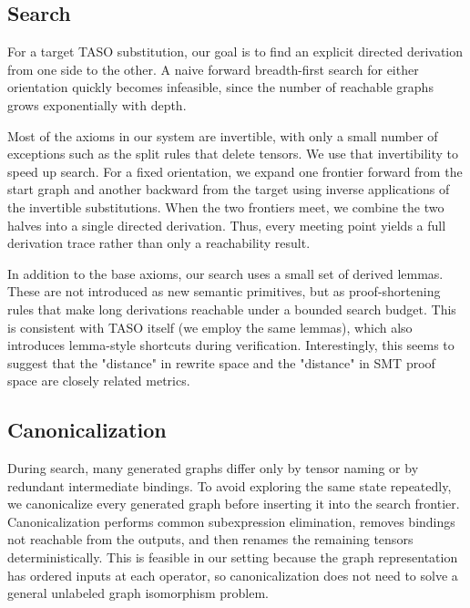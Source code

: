 \documentclass[sigplan,10pt,nonacm]{acmart}
\begin{document}
\subsection{Search}

For a target TASO substitution, our goal is to find an explicit directed derivation from one side to the other. A naive forward breadth-first search for either orientation quickly becomes infeasible, since the number of reachable graphs grows exponentially with depth.

Most of the axioms in our system are invertible, with only a small number of exceptions such as the split rules that delete tensors. We use that invertibility to speed up search. For a fixed orientation, we expand one frontier forward from the start graph and another backward from the target using inverse applications of the invertible substitutions. When the two frontiers meet, we combine the two halves into a single directed derivation. Thus, every meeting point yields a full derivation trace rather than only a reachability result.

In addition to the base axioms, our search uses a small set of derived lemmas. These are not introduced as new semantic primitives, but as proof-shortening rules that make long derivations reachable under a bounded search budget. This is consistent with TASO itself (we employ the same lemmas), which also introduces lemma-style shortcuts during verification. Interestingly, this seems to suggest that the "distance" in rewrite space and the "distance" in SMT proof space are closely related metrics.

\subsection{Canonicalization}

During search, many generated graphs differ only by tensor naming or by redundant intermediate bindings. To avoid exploring the same state repeatedly, we canonicalize every generated graph before inserting it into the search frontier. Canonicalization performs common subexpression elimination, removes bindings not reachable from the outputs, and then renames the remaining tensors deterministically. This is feasible in our setting because the graph representation has ordered inputs at each operator, so canonicalization does not need to solve a general unlabeled graph isomorphism problem.

\end{document}
